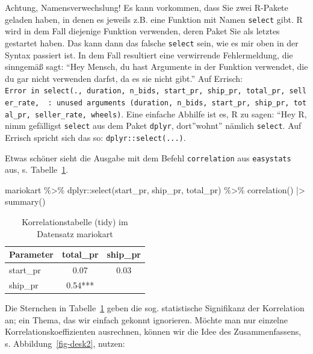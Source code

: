 \documentclass[
  letterpaper,
  oneside,
  open=any]{scrbook}
\newenvironment{Shaded}{\begin{snugshade}}{\end{snugshade}}
\newcommand{\FunctionTok}[1]{\textcolor[rgb]{0.28,0.35,0.67}{#1}}
\newcommand{\NormalTok}[1]{\textcolor[rgb]{0.00,0.23,0.31}{#1}}
\newcommand{\SpecialCharTok}[1]{\textcolor[rgb]{0.37,0.37,0.37}{#1}}
\theoremstyle{definition}
\theoremstyle{definition}
\theoremstyle{definition}
\theoremstyle{remark}
\begin{document}
Achtung, Namensverwechslung! Es kann vorkommen, dass Sie zwei R-Pakete
geladen haben, in denen es jeweils z.B. eine Funktion mit Namen
\texttt{select} gibt. R wird in dem Fall diejenige Funktion verwenden,
deren Paket Sie als letztes gestartet haben. Das kann dann das falsche
\texttt{select} sein, wie es mir oben in der Syntax passiert ist. In dem
Fall resultiert eine verwirrende Fehlermeldung, die sinngemäß sagt:
\enquote{Hey Mensch, du hast Argumente in der Funktion verwendet, die du
gar nicht verwenden darfst, da es sie nicht gibt.} Auf Errisch:
\texttt{Error\ in\ select(.,\ duration,\ n\_bids,\ start\_pr,\ ship\_pr,\ total\_pr,\ seller\_rate,\ \ :\ unused\ arguments\ (duration,\ n\_bids,\ start\_pr,\ ship\_pr,\ total\_pr,\ seller\_rate,\ wheels)}.
Eine einfache Abhilfe ist es, R zu sagen: \enquote{Hey R, nimm
gefälligst \texttt{select} aus dem Paket \texttt{dplyr}, dort}wohnt''
nämlich \texttt{select}. Auf Errisch spricht sich das so:
\texttt{dplyr::select(...)}.

Etwas schöner sieht die Ausgabe mit dem Befehl \texttt{correlation} aus
\texttt{easystats} aus, s. Tabelle~\ref{tbl-mario-corr-pdf}.

\begin{Shaded}
\begin{Highlighting}[]
\NormalTok{mariokart }\SpecialCharTok{\%\textgreater{}\%} 
\NormalTok{  dplyr}\SpecialCharTok{::}\FunctionTok{select}\NormalTok{(start\_pr, ship\_pr, total\_pr) }\SpecialCharTok{\%\textgreater{}\%} 
  \FunctionTok{correlation}\NormalTok{() }\SpecialCharTok{|\textgreater{}} 
  \FunctionTok{summary}\NormalTok{() }
\end{Highlighting}
\end{Shaded}

\begin{longtable}[]{@{}lcc@{}}

\caption{\label{tbl-mario-corr-pdf}Korrelationstabelle (tidy) im
Datensatz mariokart}

\tabularnewline

\toprule\noalign{}
Parameter & total\_pr & ship\_pr \\
\midrule\noalign{}
\endhead
\bottomrule\noalign{}
\endlastfoot
start\_pr & 0.07 & 0.03 \\
ship\_pr & 0.54*** & \\

\end{longtable}

Die Sternchen in Tabelle~\ref{tbl-mario-corr-pdf} geben die sog.
statistische Signifikanz der Korrelation an; ein Thema, das wir einfach
gekonnt ignorieren. Möchte man nur einzelne Korrelationskoeffizienten
ausrechnen, können wir die Idee des Zusammenfassens, s.
Abbildung~\ref{fig-desk2}, nutzen:
\end{document}
